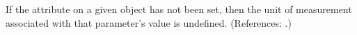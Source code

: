 If the attribute  on a given \Parameter object has not been
set, then the unit of measurement associated with that parameter's value is
undefined.  (References: .)
